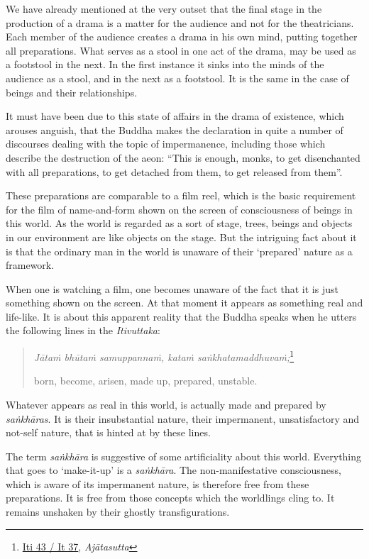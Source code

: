 We have already mentioned at the very outset that the final stage in the production of a drama is a matter for the audience and not for the theatricians. Each member of the audience creates a drama in his own mind, putting together all preparations. What serves as a stool in one act of the drama, may be used as a footstool in the next. In the first instance it sinks into the minds of the audience as a stool, and in the next as a footstool. It is the same in the case of beings and their relationships.

It must have been due to this state of affairs in the drama of existence, which arouses anguish, that the Buddha makes the declaration in quite a number of discourses dealing with the topic of impermanence, including those which describe the destruction of the aeon: ``This is enough, monks, to get disenchanted with all preparations, to get detached from them, to get released from them''.

These preparations are comparable to a film reel, which is the basic requirement for the film of name-and-form shown on the screen of consciousness of beings in this world. As the world is regarded as a sort of stage, trees, beings and objects in our environment are like objects on the stage. But the intriguing fact about it is that the ordinary man in the world is unaware of their `prepared' nature as a framework.

When one is watching a film, one becomes unaware of the fact that it is just something shown on the screen. At that moment it appears as something real and life-like. It is about this apparent reality that the Buddha speaks when he utters the following lines in the \emph{Itivuttaka}:

\begin{quote}
\emph{Jātaṁ bhūtaṁ samuppannaṁ, kataṁ saṅkhatamaddhuvaṁ;}\footnote{\href{https://suttacentral.net/iti43/pli/ms}{Iti 43 / It 37}, \emph{Ajātasutta}}

born, become, arisen, made up, prepared, unstable.
\end{quote}

Whatever appears as real in this world, is actually made and prepared by \emph{saṅkhāras}. It is their insubstantial nature, their impermanent, unsatisfactory and not-self nature, that is hinted at by these lines.

The term \emph{saṅkhāra} is suggestive of some artificiality about this world. Everything that goes to `make-it-up' is a \emph{saṅkhāra}. The non-manifestative consciousness, which is aware of its impermanent nature, is therefore free from these preparations. It is free from those concepts which the worldlings cling to. It remains unshaken by their ghostly transfigurations.

